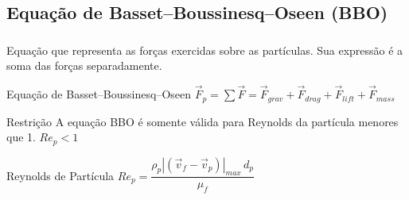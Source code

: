 \documentclass{beamer}
\begin{document}
\subsection{Equação de Basset–Boussinesq–Oseen (BBO)}
\begin{frame}
  \frametitle{\subsecname}
  
  \begin{block}{}
    Equação que representa as forças exercidas sobre as partículas.
    Sua expressão é a soma das forças separadamente.
  \end{block}
  
  \begin{block}{Equação de Basset–Boussinesq–Oseen}
    \centering
    $\vec{F}_{p} = \sum\vec{F} = \vec{F}_{grav} + \vec{F}_{drag} + \vec{F}_{lift} + \vec{F}_{mass}$
  \end{block}
  
  \begin{minipage}{.53\textwidth}
    \begin{block}{Restrição}
      A equação BBO é somente válida para Reynolds da partícula menores que 1.
      $Re_{p} < 1$
    \end{block}
    
  \end{minipage}
  \hfill
  \begin{minipage}{.41\textwidth}
    \begin{block}{Reynolds de Partícula}
      \centering
      $Re_{p} = \dfrac{\rho_p |\left(\vec{v}_{f} - \vec{v}_{p} \right)|_{max}\, d_{p}}{\mu_f}$
    \end{block}
    
  \end{minipage}
  
\end{frame}
\end{document}
